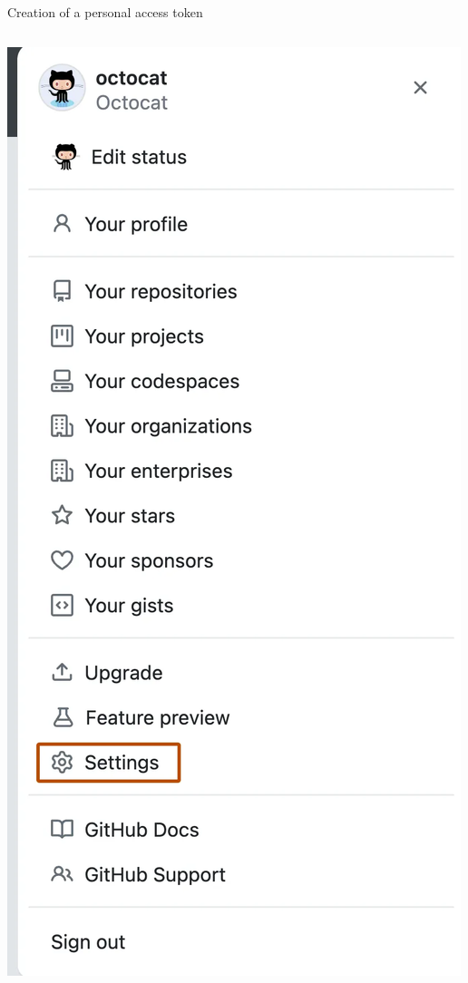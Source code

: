 \documentclass[10pt]{beamer}
\begin{document}
\begin{frame}[fragile]{Creation of a personal access token}
\begin{columns}
\begin{column}{0.33\textwidth}
\begin{center}
     \includegraphics[width=\textwidth]{img/github-settings.png}
     \end{center}
\end{column}
\end{columns}

\end{frame}
\end{document}
